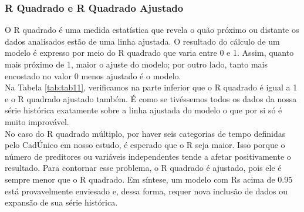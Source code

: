 \documentclass[12pt]{article}
\begin{document}
\subsubsection{R Quadrado e R Quadrado Ajustado}

O R quadrado é uma medida estatística que revela o quão próximo ou distante os dados analisados estão de uma linha ajustada. O resultado do cálculo de um modelo é expresso por meio do R quadrado que varia entre 0 e 1. Assim, quanto mais próximo de 1, maior o ajuste do modelo; por outro lado, tanto mais encostado no valor 0 menos ajustado é o modelo.\\

Na Tabela \ref{tab:tab11}, verificamos na parte inferior que o R quadrado é igual a 1 e o R quadrado ajustado também. É como se tivéssemos todos os dados da nossa série histórica exatamente sobre a linha ajustada do modelo o que por si só é muito improvável. \\

No caso do R quadrado múltiplo, por haver seis categorias de tempo definidas pelo CadÚnico em nosso estudo, é esperado que o R seja maior. Isso porque o número de preditores ou variáveis independentes tende a afetar positivamente o resultado. Para contornar esse problema, o R quadrado é ajustado, pois ele é sempre menor que o R quadrado. Em síntese, um modelo com Rs acima de 0.95 está provavelmente enviesado e, dessa forma, requer nova inclusão de dados ou expansão de sua série histórica.\\
\end{document}
